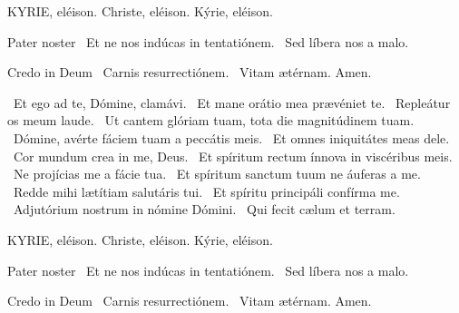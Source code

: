 
KYRIE, eléison. Christe, eléison. Kýrie, eléison.

Pater noster  \V\ Et ne nos indúcas in tentatiónem. \R\ Sed líbera nos a malo.

Credo in Deum  \V\ Carnis resurrectiónem. \R\ Vitam ætérnam. Amen.

\V\ Et ego ad te, Dómine, clamávi. \R\ Et mane orátio mea prævéniet te. \V\ Repleátur os meum laude. \R\ Ut cantem glóriam tuam, tota die magnitúdinem tuam. \V\ Dómine, avérte fáciem tuam a peccátis meis. \R\ Et omnes iniquitátes meas dele. \V\ Cor mundum crea in me, Deus. \R\ Et spíritum rectum ínnova in viscéribus meis. \V\ Ne projícias me a fácie tua. \R\ Et spíritum sanctum tuum ne áuferas a me. \V\ Redde mihi lætítiam salutáris tui. \R\ Et spíritu principáli confírma me. \V\ Adjutórium nostrum in nómine Dómini. \R\ Qui fecit cælum et terram.



KYRIE, eléison. Christe, eléison. Kýrie, eléison.

Pater noster  \V\ Et ne nos indúcas in tentatiónem. \R\ Sed líbera nos a malo.

Credo in Deum  \V\ Carnis resurrectiónem. \R\ Vitam ætérnam. Amen.

